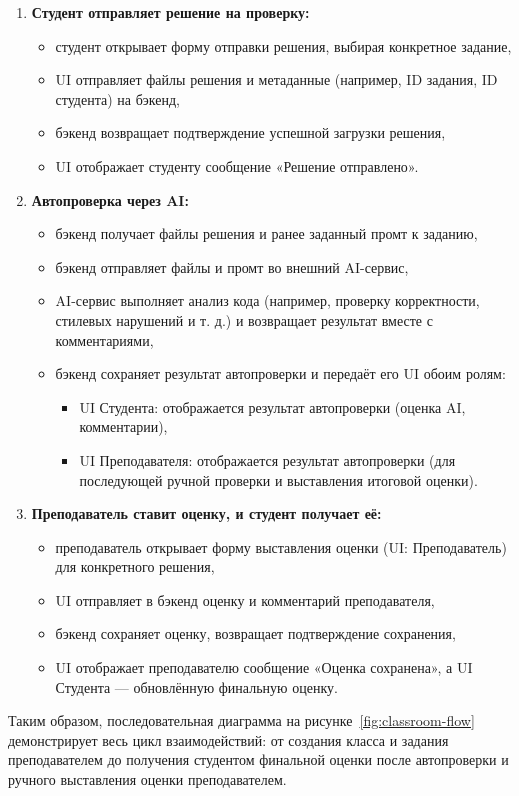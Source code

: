 \begin{enumerate}
    \item \textbf{Студент отправляет решение на проверку:}
    \begin{itemize}
        \item студент открывает форму отправки решения, выбирая конкретное задание,
        \item UI отправляет файлы решения и метаданные (например, ID задания, ID студента) на бэкенд,
        \item бэкенд возвращает подтверждение успешной загрузки решения,
        \item UI отображает студенту сообщение «Решение отправлено».
    \end{itemize}

    \item \textbf{Автопроверка через AI:}
    \begin{itemize}
        \item бэкенд получает файлы решения и ранее заданный промт к заданию,
        \item бэкенд отправляет файлы и промт во внешний AI-сервис,
        \item AI-сервис выполняет анализ кода (например, проверку корректности, стилевых нарушений и т. д.) и возвращает результат вместе с комментариями,
        \item бэкенд сохраняет результат автопроверки и передаёт его UI обоим ролям:
        \begin{itemize}
            \item UI Студента: отображается результат автопроверки (оценка AI, комментарии),
            \item UI Преподавателя: отображается результат автопроверки (для последующей ручной проверки и выставления итоговой оценки).
        \end{itemize}
    \end{itemize}

    \item \textbf{Преподаватель ставит оценку, и студент получает её:}
    \begin{itemize}
        \item преподаватель открывает форму выставления оценки (UI: Преподаватель) для конкретного решения,
        \item UI отправляет в бэкенд оценку и комментарий преподавателя,
        \item бэкенд сохраняет оценку, возвращает подтверждение сохранения,
        \item UI отображает преподавателю сообщение «Оценка сохранена», а UI Студента — обновлённую финальную оценку.
    \end{itemize}
\end{enumerate}

Таким образом, последовательная диаграмма на рисунке~\ref{fig:classroom-flow} демонстрирует весь цикл взаимодействий: от создания класса и задания преподавателем до получения студентом финальной оценки после автопроверки и ручного выставления оценки преподавателем.
